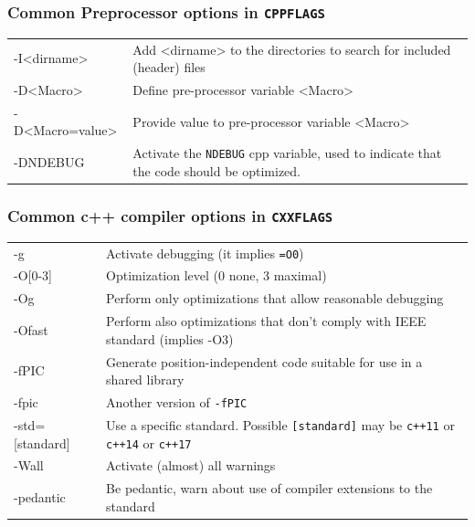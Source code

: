 \documentclass[10pt,aspectratio=169]{beamer}
\begin{document}
\begin{frame}
  \frametitle{Common Preprocessor options in \texttt{CPPFLAGS}}
 \hspace*{-0.5cm}
  \begin{tabular}{>{\ttfamily}l|p{}}
    -I<dirname> & Add <dirname> to the directories to search for included (header) files\\
    -D<Macro> & Define pre-processor variable <Macro>\\
    -D<Macro=value> & Provide value to pre-processor variable <Macro>\\
    -DNDEBUG & Activate the \texttt{NDEBUG} cpp variable, used
               to indicate that the code should be optimized.
  \end{tabular}  
\end{frame}

\begin{frame}
  \frametitle{Common c++ compiler options in \texttt{CXXFLAGS}}
 \hspace*{-0.5cm}
  \begin{tabular}{>{\ttfamily}l|p{}}
    -g & Activate debugging (it implies \texttt{=O0})\\
    -O[0-3]& Optimization level (0 none, 3 maximal)\\
    -Og & Perform only optimizations that allow reasonable debugging\\
    -Ofast & Perform also optimizations that don't comply with IEEE standard
    (implies -O3)\\
    -fPIC &  Generate position-independent code suitable for use in a
            shared library\\
    -fpic & Another version of \texttt{-fPIC}\\
    -std=[standard] & Use a specific standard. Possible
                      \texttt{[standard]} may be
                      \texttt{c++11} or \texttt{c++14} or \texttt{c++17}\\
    -Wall & Activate (almost) all warnings\\
    -pedantic & Be pedantic, warn about use of  compiler extensions to the
                standard\\
  \end{tabular}  
\end{frame}
\end{document}
